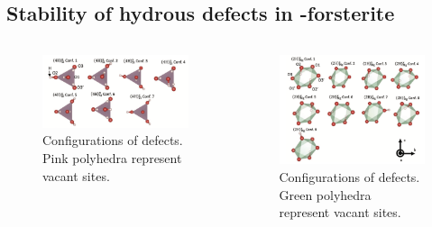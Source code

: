 \documentclass[13pt,aspectratio=169]{beamer}
\begin{document}
\subsection{Stability of hydrous defects in -forsterite}
\begin{frame}[allowframebreaks]{\subsecname}
	\begin{columns}
		\begin{column}{0.4\textwidth}
			\begin{figure}
				\includegraphics[width=\columnwidth]{images/si}%
				\caption{Configurations of 
				defects. Pink polyhedra represent vacant  sites.}
			\end{figure}
		\end{column}

		\begin{column}{0.4\textwidth}
			\begin{figure}
				\includegraphics[width=\columnwidth]{images/mg}%
				\caption{Configurations of 
				defects. Green polyhedra represent vacant  sites.}
			\end{figure}
		\end{column}
	\end{columns}


\end{frame}
\end{document}
